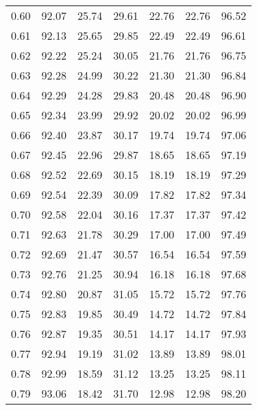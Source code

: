 \begin{tabular}{|c|c|c|c|c|c|c|}
      0.60 &     92.07 &     25.74 &      29.61 &   22.76 &      22.76 &         96.52 \\
      0.61 &     92.13 &     25.65 &      29.85 &   22.49 &      22.49 &         96.61 \\
      0.62 &     92.22 &     25.24 &      30.05 &   21.76 &      21.76 &         96.75 \\
      0.63 &     92.28 &     24.99 &      30.22 &   21.30 &      21.30 &         96.84 \\
      0.64 &     92.29 &     24.28 &      29.83 &   20.48 &      20.48 &         96.90 \\
      0.65 &     92.34 &     23.99 &      29.92 &   20.02 &      20.02 &         96.99 \\
      0.66 &     92.40 &     23.87 &      30.17 &   19.74 &      19.74 &         97.06 \\
      0.67 &     92.45 &     22.96 &      29.87 &   18.65 &      18.65 &         97.19 \\
      0.68 &     92.52 &     22.69 &      30.15 &   18.19 &      18.19 &         97.29 \\
      0.69 &     92.54 &     22.39 &      30.09 &   17.82 &      17.82 &         97.34 \\
      0.70 &     92.58 &     22.04 &      30.16 &   17.37 &      17.37 &         97.42 \\
      0.71 &     92.63 &     21.78 &      30.29 &   17.00 &      17.00 &         97.49 \\
      0.72 &     92.69 &     21.47 &      30.57 &   16.54 &      16.54 &         97.59 \\
      0.73 &     92.76 &     21.25 &      30.94 &   16.18 &      16.18 &         97.68 \\
      0.74 &     92.80 &     20.87 &      31.05 &   15.72 &      15.72 &         97.76 \\
      0.75 &     92.83 &     19.85 &      30.49 &   14.72 &      14.72 &         97.84 \\
      0.76 &     92.87 &     19.35 &      30.51 &   14.17 &      14.17 &         97.93 \\
      0.77 &     92.94 &     19.19 &      31.02 &   13.89 &      13.89 &         98.01 \\
      0.78 &     92.99 &     18.59 &      31.12 &   13.25 &      13.25 &         98.11 \\
      0.79 &     93.06 &     18.42 &      31.70 &   12.98 &      12.98 &         98.20 \\

\end{tabular}
